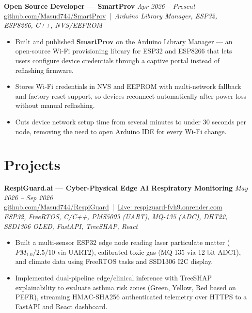 \documentclass[10pt,a4paper]{article}
\begin{document}
\textbf{Open Source Developer --- SmartProv} \hfill \textit{Apr 2026 -- Present} \\
\href{https://github.com/Masud744/SmartProv}{github.com/Masud744/SmartProv} \,|\, \textit{Arduino Library Manager, ESP32, ESP8266, C++, NVS/EEPROM}
\begin{itemize}
    \item Built and published \textbf{SmartProv} on the Arduino Library Manager --- an open-source Wi-Fi provisioning library for ESP32 and ESP8266 that lets users configure device credentials through a captive portal instead of reflashing firmware.
    \item Stores Wi-Fi credentials in NVS and EEPROM with multi-network fallback and factory-reset support, so devices reconnect automatically after power loss without manual reflashing.
    \item Cuts device network setup time from several minutes to under 30 seconds per node, removing the need to open Arduino IDE for every Wi-Fi change.
\end{itemize}

\section*{Projects}

\textbf{RespiGuard.ai --- Cyber-Physical Edge AI Respiratory Monitoring} \hfill \textit{May 2026 -- Sep 2026} \\
\href{https://github.com/Masud744/RespiGuard}{github.com/Masud744/RespiGuard} \,|\, \href{https://respiguard-fvh9.onrender.com/}{Live: respiguard-fvh9.onrender.com} \\
\textit{ESP32, FreeRTOS, C/C++, PMS5003 (UART), MQ-135 (ADC), DHT22, SSD1306 OLED, FastAPI, TreeSHAP, React}
\begin{itemize}
    \item Built a multi-sensor ESP32 edge node reading laser particulate matter ($PM_{1.0}/2.5/10$ via UART2), calibrated toxic gas (MQ-135 via 12-bit ADC1), and climate data using FreeRTOS tasks and SSD1306 I2C display.
    \item Implemented dual-pipeline edge/clinical inference with TreeSHAP explainability to evaluate asthma risk zones (Green, Yellow, Red based on PEFR), streaming HMAC-SHA256 authenticated telemetry over HTTPS to a FastAPI and React dashboard.
\end{itemize}
\vspace{2.5pt}
\end{document}
